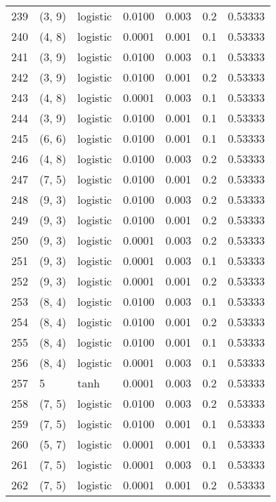 \begin{tabular}{lllrrrr}
239 &      (3, 9) &  logistic &  0.0100 &  0.003 &  0.2 &   0.53333 \\
240 &      (4, 8) &  logistic &  0.0001 &  0.001 &  0.1 &   0.53333 \\
241 &      (3, 9) &  logistic &  0.0100 &  0.003 &  0.1 &   0.53333 \\
242 &      (3, 9) &  logistic &  0.0100 &  0.001 &  0.2 &   0.53333 \\
243 &      (4, 8) &  logistic &  0.0001 &  0.003 &  0.1 &   0.53333 \\
244 &      (3, 9) &  logistic &  0.0100 &  0.001 &  0.1 &   0.53333 \\
245 &      (6, 6) &  logistic &  0.0100 &  0.001 &  0.1 &   0.53333 \\
246 &      (4, 8) &  logistic &  0.0100 &  0.003 &  0.2 &   0.53333 \\
247 &      (7, 5) &  logistic &  0.0100 &  0.001 &  0.2 &   0.53333 \\
248 &      (9, 3) &  logistic &  0.0100 &  0.003 &  0.2 &   0.53333 \\
249 &      (9, 3) &  logistic &  0.0100 &  0.001 &  0.2 &   0.53333 \\
250 &      (9, 3) &  logistic &  0.0001 &  0.003 &  0.2 &   0.53333 \\
251 &      (9, 3) &  logistic &  0.0001 &  0.003 &  0.1 &   0.53333 \\
252 &      (9, 3) &  logistic &  0.0001 &  0.001 &  0.2 &   0.53333 \\
253 &      (8, 4) &  logistic &  0.0100 &  0.003 &  0.1 &   0.53333 \\
254 &      (8, 4) &  logistic &  0.0100 &  0.001 &  0.2 &   0.53333 \\
255 &      (8, 4) &  logistic &  0.0100 &  0.001 &  0.1 &   0.53333 \\
256 &      (8, 4) &  logistic &  0.0001 &  0.003 &  0.1 &   0.53333 \\
257 &           5 &      tanh &  0.0001 &  0.003 &  0.2 &   0.53333 \\
258 &      (7, 5) &  logistic &  0.0100 &  0.003 &  0.2 &   0.53333 \\
259 &      (7, 5) &  logistic &  0.0100 &  0.001 &  0.1 &   0.53333 \\
260 &      (5, 7) &  logistic &  0.0001 &  0.001 &  0.1 &   0.53333 \\
261 &      (7, 5) &  logistic &  0.0001 &  0.003 &  0.1 &   0.53333 \\
262 &      (7, 5) &  logistic &  0.0001 &  0.001 &  0.2 &   0.53333 \\

\end{tabular}

